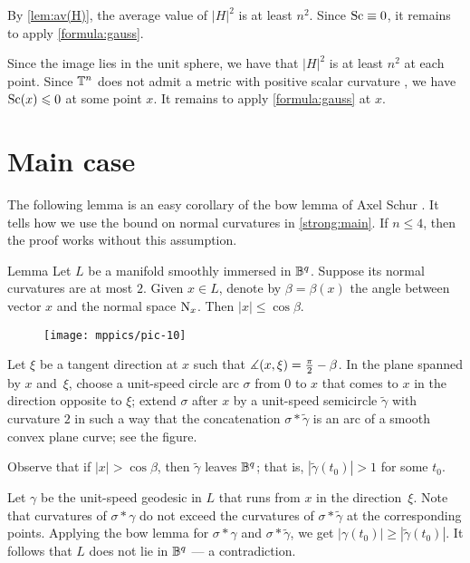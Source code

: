 \documentclass[a4paper,10pt]{article}
\begin{document}
By \ref{lem:av(H)},
the average value of $|H|^2$ is at least $n^2$.
Since $\mathrm{Sc}\equiv0$, it remains to apply \ref{formula:gauss}.
\qeds

Since the image lies in the unit sphere, we have that $|H|^2$ is at least $n^2$ at each point.
Since $\mathbb{T}^n$ does not admit a metric with positive scalar curvature \cite[Corollary A]{gromov-lawson}, we have $\mathrm{Sc}(x)\leqslant 0$ at some point $x$.
It remains to apply \ref{formula:gauss} at $x$.
\qeds

\section{Main case}

The following lemma is an easy corollary of the bow lemma of Axel Schur \cite{shur,petrunin-zamora}.
It tells how we use the bound on normal curvatures in \ref{strong:main}.
If $n\le4$, then the proof works without this assumption.

\begin{thm}{Lemma}\label{lem:trivial}
Let $L$ be a manifold smoothly immersed in $\mathbb{B}^q$.
Suppose its normal curvatures are at most $2$.
Given $x\in L$, denote by $\beta=\beta(x)$ the angle between vector $x$ and the normal space $\mathrm{N}_x$.
Then $|x|\le \cos\beta$.
\end{thm}

\begin{wrapfigure}{r}{39 mm}
\vskip-3mm
\centering
\texttt{[image: mppics/pic-10]}
\vskip0mm
\end{wrapfigure}

Let $\xi$ be a tangent direction at $x$ such that $\measuredangle(x,\xi)\z=\tfrac\pi2-\beta$.
In the plane spanned by $x$ and~$\xi$, choose a unit-speed circle arc $\sigma$ from $0$ to $x$ that comes to $x$ in the direction opposite to $\xi$;
extend $\sigma$ after $x$ by a unit-speed semicircle $\tilde\gamma$ with curvature $2$ in such a way that the concatenation $\sigma*\tilde\gamma$ is an arc of a smooth convex plane curve; see the figure.

Observe that if $|x|> \cos\beta$, then $\tilde\gamma$ leaves $\mathbb{B}^q$; that is, $|\tilde\gamma(t_0)|>1$ for some $t_0$.

Let $\gamma$ be the unit-speed geodesic in $L$ that runs from $x$ in the direction~$\xi$.
Note that curvatures of $\sigma*\gamma$ do not exceed the curvatures of $\sigma*\tilde\gamma$ at the corresponding points.
Applying the bow lemma for $\sigma*\gamma$ and $\sigma*\tilde\gamma$, we get $|\gamma(t_0)|\ge |\tilde\gamma(t_0)|$.
It follows that $L$ does not lie in $\mathbb{B}^q$ --- a contradiction.
\qeds
\end{document}
